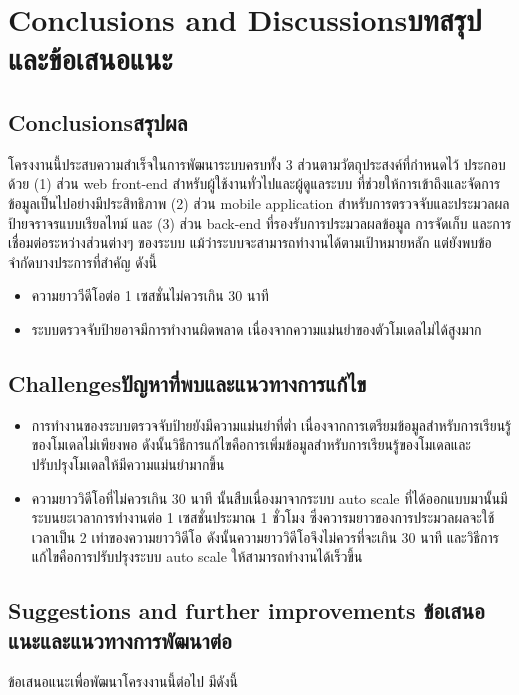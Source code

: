 \chapter{\ifenglish Conclusions and Discussions\else บทสรุปและข้อเสนอแนะ\fi}

\section{\ifenglish Conclusions\else สรุปผล\fi}

โครงงานนี้ประสบความสำเร็จในการพัฒนาระบบครบทั้ง 3 ส่วนตามวัตถุประสงค์ที่กำหนดไว้ ประกอบด้วย (1) ส่วน web front-end สำหรับผู้ใช้งานทั่วไปและผู้ดูแลระบบ ที่ช่วยให้การเข้าถึงและจัดการข้อมูลเป็นไปอย่างมีประสิทธิภาพ (2) ส่วน mobile application สำหรับการตรวจจับและประมวลผลป้ายจราจรแบบเรียลไทม์ และ (3) ส่วน back-end ที่รองรับการประมวลผลข้อมูล การจัดเก็บ และการเชื่อมต่อระหว่างส่วนต่างๆ ของระบบ แม้ว่าระบบจะสามารถทำงานได้ตามเป้าหมายหลัก แต่ยังพบข้อจำกัดบางประการที่สำคัญ ดังนี้

\begin{itemize}
    \item ความยาววีดีโอต่อ 1 เซสชั่นไม่ควรเกิน 30 นาที
    \item ระบบตรวจจับป้ายอาจมีการทำงานผิดพลาด เนื่องจากความแม่นยำของตัวโมเดลไม่ได้สูงมาก
\end{itemize}

\section{\ifenglish Challenges\else ปัญหาที่พบและแนวทางการแก้ไข\fi}

\begin{itemize}
    \item การทำงานของระบบตรวจจับป้ายยังมีความแม่นยำที่ต่ำ เนื่องจากการเตรียมข้อมูลสำหรับการเรียนรู้ของโมเดลไม่เพียงพอ ดังนั้นวิธีการแก้ไขคือการเพิ่มข้อมูลสำหรับการเรียนรู้ของโมเดลและปรับปรุงโมเดลให้มีความแม่นยำมากขึ้น
    \item ความยาววิดีโอที่ไม่ควรเกิน 30 นาที นั้นสืบเนื่องมาจากระบบ auto scale ที่ได้ออกแบบมานั้นมีระบนยะเวลาการทำงานต่อ 1 เซสชั่นประมาณ 1 ชั่วโมง ซึ่งควารมยาวของการประมวลผลจะใช้เวลาเป็น 2 เท่าของความยาววิดีโอ ดังนั้นความยาววิดีโอจึงไม่ควรที่จะเกิน 30 นาที และวิธีการแก้ไขคือการปรับปรุงระบบ auto scale ให้สามารถทำงานได้เร็วขึ้น
\end{itemize}

\section{\ifenglish%
Suggestions and further improvements
\else%
ข้อเสนอแนะและแนวทางการพัฒนาต่อ
\fi
}

ข้อเสนอแนะเพื่อพัฒนาโครงงานนี้ต่อไป มีดังนี้